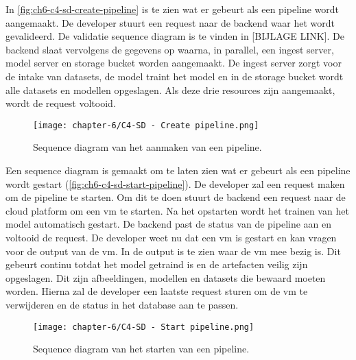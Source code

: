 In \autoref{fig:ch6-c4-sd-create-pipeline} is te zien wat er gebeurt als een pipeline wordt aangemaakt. De developer stuurt een request naar de backend waar het wordt gevalideerd. De validatie sequence diagram is te vinden in [BIJLAGE LINK]. De backend slaat vervolgens de gegevens op waarna, in parallel, een ingest server, model server en storage bucket worden aangemaakt. De ingest server zorgt voor de intake van datasets, de model traint het model en in de storage bucket wordt alle datasets en modellen opgeslagen. Als deze drie resources zijn aangemaakt, wordt de request voltooid.

\begin{figure}[hbt!]
  \centering
  \texttt{[image: chapter-6/C4-SD - Create pipeline.png]}
  \caption{Sequence diagram van het aanmaken van een pipeline.}
  \label{fig:ch6-c4-sd-create-pipeline}
\end{figure}

\newpage

Een sequence diagram is gemaakt om te laten zien wat er gebeurt als een pipeline wordt gestart (\autoref{fig:ch6-c4-sd-start-pipeline}). De developer zal een request maken om de pipeline te starten. Om dit te doen stuurt de backend een request naar de cloud platform om een \acrfull{vm} te starten. Na het opstarten wordt het trainen van het model automatisch gestart. De backend past de status van de pipeline aan en voltooid de request. De developer weet nu dat een \acrshort{vm} is gestart en kan vragen voor de output van de \acrshort{vm}. In de output is te zien waar de \acrshort{vm} mee bezig is. Dit gebeurt continu totdat het model getraind is en de artefacten veilig zijn opgeslagen. Dit zijn afbeeldingen, modellen en datasets die bewaard moeten worden. Hierna zal de developer een laatste request sturen om de \acrshort{vm} te verwijderen en de status in het database aan te passen. 

\begin{figure}[hbt!]
  \centering
  \texttt{[image: chapter-6/C4-SD - Start pipeline.png]}
  \caption{Sequence diagram van het starten van een pipeline.}
  \label{fig:ch6-c4-sd-start-pipeline}
\end{figure}

